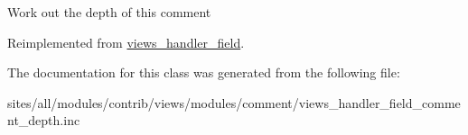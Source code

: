 Work out the depth of this comment 

Reimplemented from \hyperlink{classviews__handler__field_82ff951c5e9ceb97b2eab86f880cbc1e}{views\_\-handler\_\-field}.

The documentation for this class was generated from the following file:\begin{CompactItemize}
\item 
sites/all/modules/contrib/views/modules/comment/views\_\-handler\_\-field\_\-comment\_\-depth.inc\end{CompactItemize}
